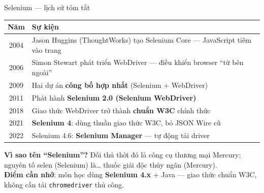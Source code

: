 \documentclass[aspectratio=169,12pt]{beamer}
\begin{document}
\begin{frame}{Selenium --- lịch sử tóm tắt}
  \begin{center}
  \footnotesize
  \begin{tabularx}{\textwidth}{c>{\raggedright\arraybackslash}X}
    \toprule
    \textbf{Năm} & \textbf{Sự kiện} \\
    \midrule
    2004 & Jason Huggins (ThoughtWorks) tạo Selenium Core --- JavaScript tiêm vào trang \\
    2006 & Simon Stewart phát triển WebDriver --- điều khiển browser ``từ bên ngoài'' \\
    2009 & Hai dự án \textbf{công bố hợp nhất} (Selenium + WebDriver) \\
    2011 & Phát hành \textbf{Selenium 2.0 (Selenium WebDriver)} \\
    2018 & Giao thức WebDriver trở thành \textbf{chuẩn W3C} chính thức \\
    2021 & \textbf{Selenium 4}: dùng thuần giao thức W3C, bỏ JSON Wire cũ \\
    2022 & Selenium 4.6: \textbf{Selenium Manager} --- tự động tải driver \\
    \bottomrule
  \end{tabularx}
  \end{center}

  {\small \textbf{Vì sao tên ``Selenium''?} Đối thủ thời đó là công cụ thương
  mại Mercury; nguyên tố selen (Selenium) là\ldots{} thuốc giải độc thủy ngân
  (Mercury).\\[0.25em]
  \textbf{Điểm cần nhớ}: môn học dùng \textbf{Selenium 4.x} + Java --- giao
  thức chuẩn W3C, không cần tải \texttt{chromedriver} thủ công.}
\end{frame}
\end{document}
